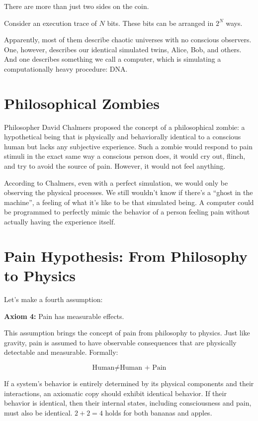There are more than just two sides on the coin.

Consider an execution trace of $N$ bits. These bits can be arranged in $2^N$ ways.

Apparently, most of them describe chaotic universes with no conscious observers.
One, however, describes our identical simulated twins, Alice, Bob, and others.
And one describes something we call a computer, which is simulating a computationally heavy procedure: DNA.


\section{Philosophical Zombies}

Philosopher David Chalmers proposed the concept of a philosophical zombie: a hypothetical being that is physically and behaviorally identical to a conscious human but lacks any subjective experience.
Such a zombie would respond to pain stimuli in the exact same way a conscious person does, it would cry out, flinch, and try to avoid the source of pain. However, it would not feel anything.

According to Chalmers, even with a perfect simulation, we would only be observing the physical processes.
We still wouldn't know if there's a ``ghost in the machine'', a feeling of what it's like to be that simulated being.
A computer could be programmed to perfectly mimic the behavior of a person feeling pain without actually having the experience itself. 


\section*{Pain Hypothesis: From Philosophy to Physics}

Let's make a fourth assumption:

\textbf{Axiom 4:} Pain has measurable effects.

This assumption brings the concept of pain from philosophy to physics.
Just like gravity, pain is assumed to have observable consequences that are physically detectable and measurable. Formally:

\[
\text{Human} \neq \text{Human + Pain}
\]

If a system's behavior is entirely determined by its physical components and their interactions, an axiomatic copy should exhibit identical behavior.
If their behavior is identical, then their internal states, including consciousness and pain, must also be identical.
$2+2=4$ holds for both bananas and apples.

